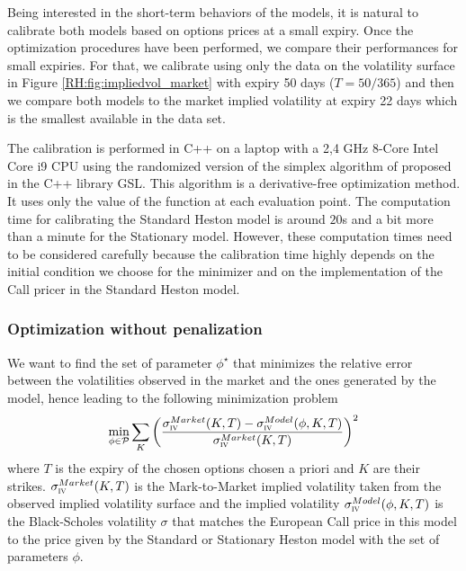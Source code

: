 Being interested in the short-term behaviors of the models, it is natural to calibrate both models based on options prices at a small expiry. Once the optimization procedures have been performed, we compare their performances for small expiries. For that, we calibrate using only the data on the volatility surface in Figure \ref{RH:fig:impliedvol_market} with expiry 50 days ($T = 50/365$) and then we compare both models to the market implied volatility at expiry 22 days which is the smallest available in the data set.

\begin{remark}
	The calibration is performed in C++ on a laptop with a 2,4 GHz 8-Core Intel Core i9 CPU using the randomized version of the simplex algorithm of \cite{nelder1965simplex} proposed in the C++ library GSL. This algorithm is a derivative-free optimization method. It uses only the value of the function at each evaluation point. The computation time for calibrating the Standard Heston model is around $20$s and a bit more than a minute for the Stationary model. However, these computation times need to be considered carefully because the calibration time highly depends on the initial condition we choose for the minimizer and on the implementation of the Call pricer in the Standard Heston model.
\end{remark}

\subsubsection{Optimization without penalization}

We want to find the set of parameter $\phi^{\star}$ that minimizes the relative error between the volatilities observed in the market and the ones generated by the model, hence leading to the following minimization problem
\begin{equation}
	\min_{ \phi \in \mathcal{P} } \sum_{K} \bigg( \frac{ \sigma_{\textsc{iv}}^{Market}(K,T) - \sigma_{\textsc{iv}}^{Model}(\phi, K,T) }{ \sigma_{\textsc{iv}}^{Market}(K,T) } \bigg)^2
\end{equation}
where $T$ is the expiry of the chosen options chosen a priori and $K$ are their strikes. $\sigma_{\textsc{iv}}^{Market}(K,T)$ is the Mark-to-Market implied volatility taken from the observed implied volatility surface and the implied volatility $\sigma_{\textsc{iv}}^{Model}(\phi, K,T)$ is the Black-Scholes volatility $\sigma$ that matches the European Call price in this model to the price given by the Standard or Stationary Heston model with the set of parameters $\phi$.



